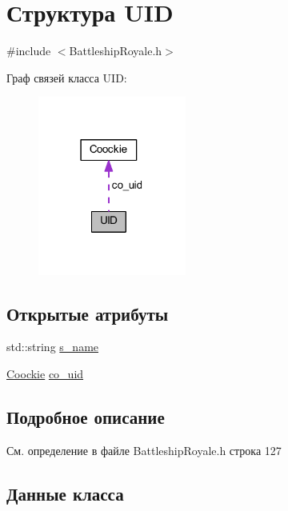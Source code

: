 \hypertarget{struct_u_i_d}{}\section{Структура U\+ID}
\label{struct_u_i_d}


{\ttfamily \#include $<$Battleship\+Royale.\+h$>$}



Граф связей класса U\+ID\+:\nopagebreak
\begin{figure}[H]
\begin{center}
\leavevmode
\includegraphics[width=138pt]{struct_u_i_d__coll__graph}
\end{center}
\end{figure}
\subsection*{Открытые атрибуты}
\begin{DoxyCompactItemize}
\item 
std\+::string \mbox{\hyperlink{struct_u_i_d_ad126ab7d56812c322727617b427068ad}{s\+\_\+name}}
\item 
\mbox{\hyperlink{struct_coockie}{Coockie}} \mbox{\hyperlink{struct_u_i_d_acf7ef2a71d9a80e890f911425e46d7f0}{co\+\_\+uid}}
\end{DoxyCompactItemize}


\subsection{Подробное описание}


См. определение в файле Battleship\+Royale.\+h строка 127



\subsection{Данные класса}
\mbox{\label{struct_u_i_d_acf7ef2a71d9a80e890f911425e46d7f0}} 
